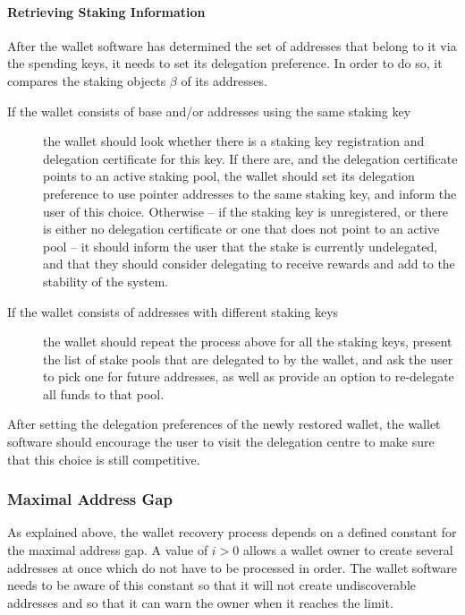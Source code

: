 \documentclass[11pt,a4paper]{article}
\begin{document}
\paragraph{Retrieving Staking Information}
\label{retrieving-staking-information}

After the wallet software has determined the set of addresses that
belong to it via the spending keys, it needs to set its delegation
preference. In order to do so, it compares the staking objects \(\beta\)
of its addresses.

\begin{description}
\item[If the wallet consists of base and/or addresses using the same
  staking key] the wallet should look whether there is a staking key
  registration and delegation certificate for this key. If there are,
  and the delegation certificate points to an active staking pool, the
  wallet should set its delegation preference to use pointer addresses
  to the same staking key, and inform the user of this
  choice. Otherwise -- if the staking key is unregistered, or there is
  either no delegation certificate or one that does not point to an
  active pool -- it should inform the user that the stake is currently
  undelegated, and that they should consider delegating to receive
  rewards and add to the stability of the system.

\item[If the wallet consists of addresses with different staking keys]
  the wallet should repeat the process above for all the staking keys,
  present the list of stake pools that are delegated to by the wallet,
  and ask the user to pick one for future addresses, as well as
  provide an option to re-delegate all funds to that pool.
\end{description}

After setting the delegation preferences of the newly restored wallet,
the wallet software should encourage the user to visit the delegation
centre to make sure that this choice is still competitive.

\subsubsection{Maximal Address Gap}
\label{maximal-address-gap}

As explained above, the wallet recovery process depends on a defined
constant for the maximal address gap. A value of \(i>0\) allows a wallet
owner to create several addresses at once which do not have to be
processed in order. The wallet software needs to be aware of this
constant so that it will not create undiscoverable addresses and so that
it can warn the owner when it reaches the limit.
\end{document}
